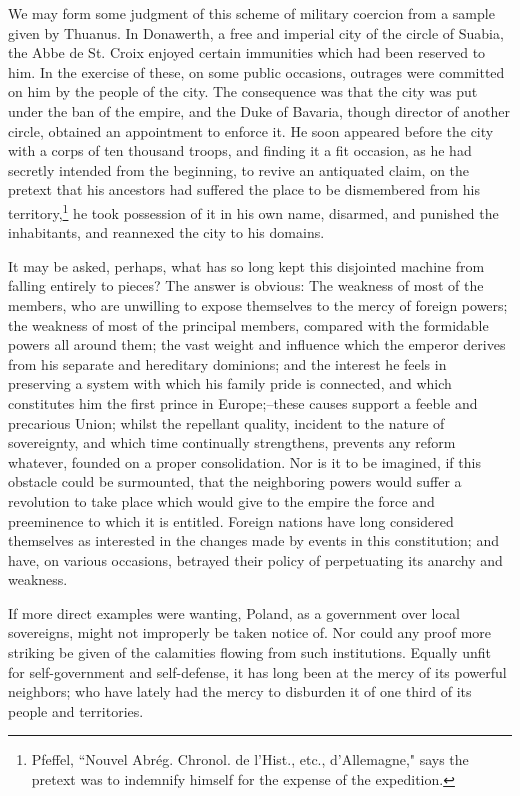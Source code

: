 We may form some judgment of this scheme of military coercion from a sample given by Thuanus. 
In Donawerth, a free and imperial city of the circle of Suabia, the Abbe de St. 
Croix enjoyed certain immunities which had been reserved to him. 
In the exercise of these, on some public occasions, outrages were committed on him by the people of the city. 
The consequence was that the city was put under the ban of the empire, and the Duke of Bavaria, though director of another circle, obtained an appointment to enforce it. 
He soon appeared before the city with a corps of ten thousand troops, and finding it a fit occasion, as he had secretly intended from the beginning, to revive an antiquated claim, on the pretext that his ancestors had suffered the place to be dismembered from his territory,\footnote{Pfeffel, ``Nouvel Abrég. 
Chronol. 
de l'Hist., etc., d'Allemagne," says the pretext was to indemnify himself for the expense of the expedition.} he took possession of it in his own name, disarmed, and punished the inhabitants, and reannexed the city to his domains.

It may be asked, perhaps, what has so long kept this disjointed machine from falling entirely to pieces? 
The answer is obvious: The weakness of most of the members, who are unwilling to expose themselves to the mercy of foreign powers; the weakness of most of the principal members, compared with the formidable powers all around them; the vast weight and influence which the emperor derives from his separate and hereditary dominions; and the interest he feels in preserving a system with which his family pride is connected, and which constitutes him the first prince in Europe;--these causes support a feeble and precarious Union; whilst the repellant quality, incident to the nature of sovereignty, and which time continually strengthens, prevents any reform whatever, founded on a proper consolidation. 
Nor is it to be imagined, if this obstacle could be surmounted, that the neighboring powers would suffer a revolution to take place which would give to the empire the force and preeminence to which it is entitled. 
Foreign nations have long considered themselves as interested in the changes made by events in this constitution; and have, on various occasions, betrayed their policy of perpetuating its anarchy and weakness.

If more direct examples were wanting, Poland, as a government over local sovereigns, might not improperly be taken notice of. 
Nor could any proof more striking be given of the calamities flowing from such institutions. 
Equally unfit for self-government and self-defense, it has long been at the mercy of its powerful neighbors; who have lately had the mercy to disburden it of one third of its people and territories.

